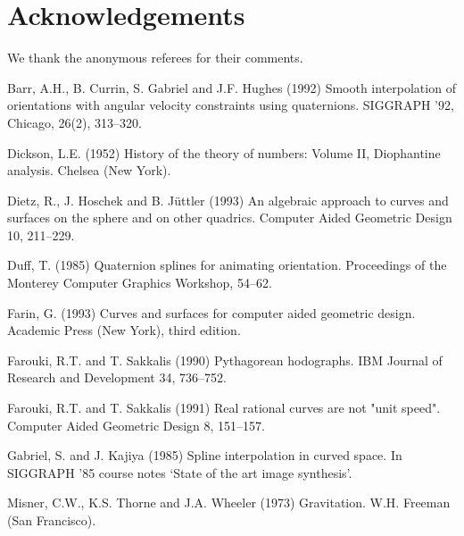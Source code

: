 
\section{Acknowledgements}
We thank the anonymous referees for their comments.

\parindent=-20mm


\begin{thebibliography}{Shoemake 85}

Barr, A.H., B. Currin, S. Gabriel and J.F. Hughes (1992)
Smooth interpolation of orientations with angular velocity
constraints using quaternions.  SIGGRAPH '92, Chicago, 26(2), 313--320.

Dickson, L.E. (1952) History of the theory of numbers: Volume II,
Diophantine analysis.  Chelsea (New York).

Dietz, R., J. Hoschek and B. J\"{u}ttler (1993)
An algebraic approach to curves and surfaces on the sphere and on other
quadrics.  Computer Aided Geometric Design 10, 211--229.

Duff, T. (1985) Quaternion splines for animating orientation.
Proceedings of the Monterey Computer Graphics Workshop,
54--62.

Farin, G. (1993) Curves and surfaces for computer aided geometric design.
Academic Press (New York), third edition.

Farouki, R.T. and T. Sakkalis (1990) Pythagorean hodographs.
IBM Journal of Research and Development 34, 736--752.

Farouki, R.T. and T. Sakkalis (1991) Real rational curves are not
"unit speed".  Computer Aided Geometric Design 8, 151--157.

Gabriel, S. and J. Kajiya (1985) Spline interpolation in curved space.
In SIGGRAPH '85 course notes `State of the art image synthesis'.


Misner, C.W., K.S. Thorne and J.A. Wheeler (1973)
Gravitation.  W.H. Freeman (San Francisco).


\end{thebibliography}
